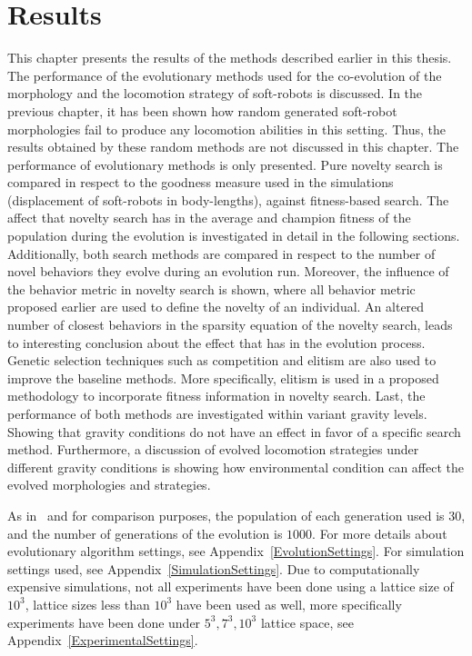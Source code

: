 
\chapter{Results} %

\label{Results} %


This chapter presents the results of the methods described earlier in this thesis. The performance of the evolutionary methods used for the co-evolution of the morphology and the locomotion strategy of soft-robots is discussed. In the previous chapter, it has been shown how random generated soft-robot morphologies fail to produce any locomotion abilities in this setting. Thus, the results obtained by these random methods are not discussed in this chapter. The performance of evolutionary methods is only presented. Pure novelty search is compared in respect to the goodness measure used in the simulations (displacement of soft-robots in body-lengths), against fitness-based search. The affect that novelty search has in the average and champion fitness of the population during the evolution is investigated in detail in the following sections. Additionally, both search methods are compared in respect to the number of novel behaviors they evolve during an evolution run. Moreover, the influence of the behavior metric in novelty search is shown, where all behavior metric proposed earlier are used to define the novelty of an individual. An altered number of closest behaviors in the sparsity equation of the novelty search, leads to interesting conclusion about the effect that has in the evolution process. Genetic selection techniques such as competition and elitism are also used to improve the baseline methods. More specifically, elitism is used in a proposed methodology to incorporate fitness information in novelty search. Last, the performance of both methods are investigated within variant gravity levels. Showing that gravity conditions do not have an effect in favor of a specific search method. Furthermore, a discussion of evolved locomotion strategies under different gravity conditions is showing how environmental condition can affect the evolved morphologies and strategies.

As in~\citep{cheney2013unshackling} and for comparison purposes, the population of each generation used is $30$, and the number of generations of the evolution is $1000$. For more details about evolutionary algorithm settings, see Appendix~\ref{EvolutionSettings}. For simulation settings used, see Appendix~\ref{SimulationSettings}. Due to computationally expensive simulations, not all experiments have been done using a lattice size of $10^3$, lattice sizes less than $10^3$ have been used as well, more specifically experiments have been done under $5^3, 7^3, 10^3$ lattice space, see Appendix~\ref{ExperimentalSettings}.



